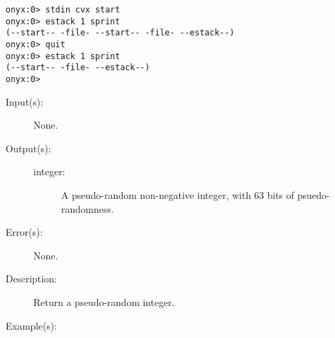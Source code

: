 \begin{description}
\begin{description}
\begin{verbatim}
onyx:0> stdin cvx start
onyx:0> estack 1 sprint
(--start-- -file- --start-- -file- --estack--)
onyx:0> quit
onyx:0> estack 1 sprint
(--start-- -file- --estack--)
onyx:0>
		\end{verbatim}
	\end{description}
\label{systemdict:rand}
\item[{\onyxop{--}{rand}{integer}}: ]
	\begin{description}\item[]
	\item[Input(s): ] None.
	\item[Output(s): ]
		\begin{description}\item[]
		\item[integer: ]
			A pseudo-random non-negative integer, with 63 bits of
			psuedo-randomness.
		\end{description}
	\item[Error(s): ] None.
	\item[Description: ]
		Return a pseudo-random integer.
	\item[Example(s): ]\begin{verbatim}


\end{verbatim}
\end{description}
\end{description}
